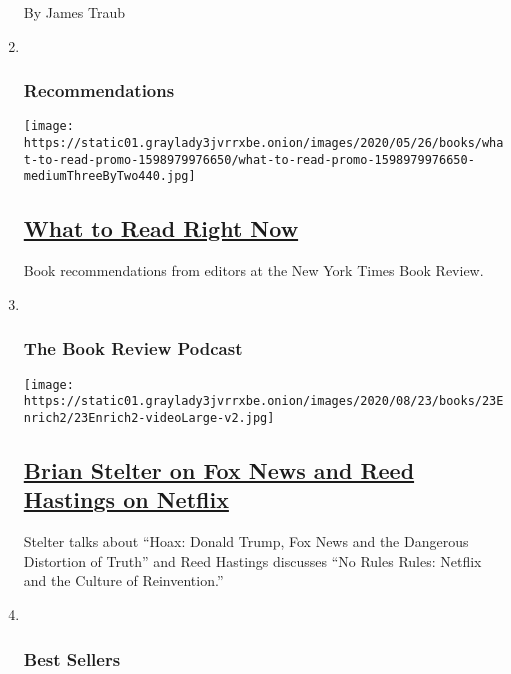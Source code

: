 \begin{enumerate}
  By James Traub
\item ~
  \hypertarget{recommendations}{%
  \subsubsection{Recommendations}\label{recommendations}}

  \texttt{[image: https://static01.graylady3jvrrxbe.onion/images/2020/05/26/books/what-to-read-promo-1598979976650/what-to-read-promo-1598979976650-mediumThreeByTwo440.jpg]}

  \hypertarget{what-to-read-right-now}{%
  \subsection{\texorpdfstring{\href{/interactive/2020/09/01/books/what-to-read-promo.html}{What
  to Read Right
  Now}}{What to Read Right Now}}\label{what-to-read-right-now}}

  Book recommendations from editors at the New York Times Book Review.
\item ~
  \hypertarget{the-book-review-podcast}{%
  \subsubsection{The Book Review
  Podcast}\label{the-book-review-podcast}}

  \texttt{[image: https://static01.graylady3jvrrxbe.onion/images/2020/08/23/books/23Enrich2/23Enrich2-videoLarge-v2.jpg]}

  \hypertarget{brian-stelter-on-fox-news-and-reed-hastings-on-netflix}{%
  \subsection{\texorpdfstring{\href{/2020/09/11/books/review/podcast-hoax-fox-news-donald-trump-brian-stelter-nextflix-reed-hastings.html}{Brian
  Stelter on Fox News and Reed Hastings on
  Netflix}}{Brian Stelter on Fox News and Reed Hastings on Netflix}}\label{brian-stelter-on-fox-news-and-reed-hastings-on-netflix}}

  Stelter talks about ``Hoax: Donald Trump, Fox News and the Dangerous
  Distortion of Truth'' and Reed Hastings discusses ``No Rules Rules:
  Netflix and the Culture of Reinvention.''
\item ~
  \hypertarget{best-sellers}{%
  \subsubsection{Best Sellers}\label{best-sellers}}


\end{enumerate}
